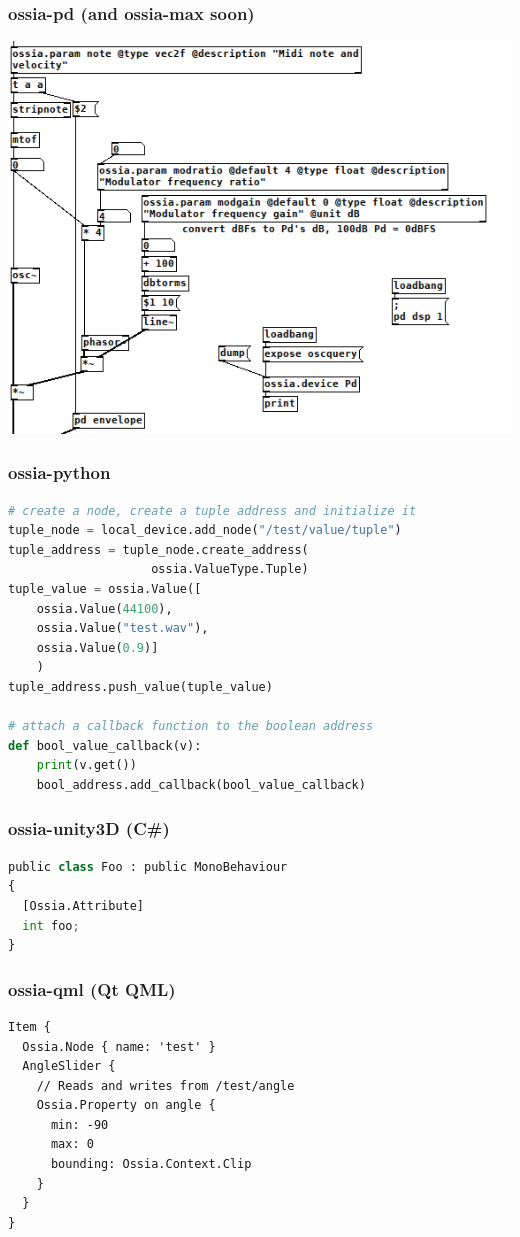 \documentclass[handout]{beamer}
\begin{document}
\begin{frame}
\frametitle{ossia-pd (and ossia-max soon)}
\Large
\includegraphics[width=\textwidth]{images/ossiapd.png}
\end{frame}

\begin{frame}[fragile]
\frametitle{ossia-python}
\footnotesize
\begin{lstlisting}[language=python]
# create a node, create a tuple address and initialize it
tuple_node = local_device.add_node("/test/value/tuple")
tuple_address = tuple_node.create_address(
                    ossia.ValueType.Tuple)
tuple_value = ossia.Value([
    ossia.Value(44100),
    ossia.Value("test.wav"),
    ossia.Value(0.9)]
    )
tuple_address.push_value(tuple_value)

# attach a callback function to the boolean address
def bool_value_callback(v):
    print(v.get())
    bool_address.add_callback(bool_value_callback)
\end{lstlisting}
\end{frame}

\begin{frame}[fragile]
\frametitle{ossia-unity3D (C\#)}
\Large
\footnotesize
\begin{lstlisting}[language=python]
public class Foo : public MonoBehaviour
{
  [Ossia.Attribute]
  int foo;
}
\end{lstlisting}
\end{frame}

\begin{frame}[fragile]
\frametitle{ossia-qml (Qt QML)}
\small
\begin{lstlisting}
Item {
  Ossia.Node { name: 'test' }
  AngleSlider {
    // Reads and writes from /test/angle
    Ossia.Property on angle {
      min: -90
      max: 0
      bounding: Ossia.Context.Clip
    }
  }
}
\end{lstlisting}
\end{frame}
\end{document}
